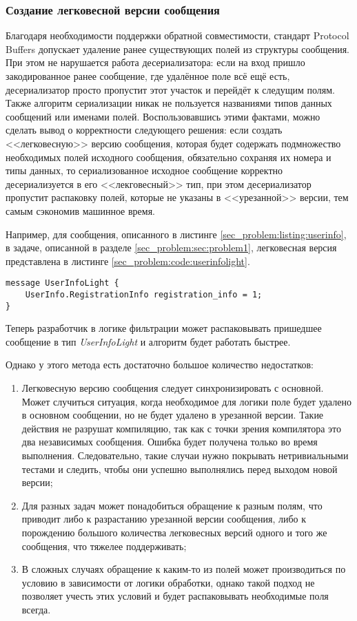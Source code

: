 \pagebreak

\subsubsection{Создание легковесной версии сообщения}

Благодаря необходимости поддержки обратной совместимости, стандарт Protocol Buffers допускает удаление ранее существующих полей из структуры сообщения.
При этом не нарушается работа десериализатора: если на вход пришло закодированное ранее сообщение, где удалённое поле всё ещё есть, десериализатор просто пропустит
этот участок и перейдёт к следущим полям. 
Также алгоритм сериализации никак не пользуется названиями типов данных сообщений или именами полей.
Воспользовавшись этими фактами, можно сделать вывод о корректности следующего решения: если создать <<легковесную>> версию сообщения, которая будет содержать подмножество
необходимых полей исходного сообщения, обязательно сохраняя их номера и типы данных, то сериализованное исходное сообщение корректно десериализуется в его <<лекговесный>>
тип, при этом десериализатор пропустит распаковку полей, которые не указаны в <<урезанной>> версии, тем самым сэкономив машинное время.

Например, для сообщения, описанного в листинге \ref{sec_problem:listing:userinfo}, в задаче, описанной в 
разделе \ref{sec_problem:sec:problem1}, легковесная версия представлена в листинге \ref{sec_problem:code:userinfolight}.
\begin{lstlisting}[style=CodeListing, label={sec_problem:code:userinfolight}, caption={Легковесная версия сообщения UserInfo}]
message UserInfoLight {
    UserInfo.RegistrationInfo registration_info = 1;
}
\end{lstlisting}

Теперь разработчик в логике фильтрации может распаковывать пришедшее сообщение в тип \textit{UserInfoLight} и алгоритм будет работать быстрее.

Однако у этого метода есть достаточно большое количество недостатков:
\begin{enumerate}
    \item Легковесную версию сообщения следует синхронизировать с основной. Может случиться ситуация, когда необходимое для логики поле будет удалено в основном сообщении, но не будет удалено в урезанной версии. Такие действия не разрушат компиляцию, так как с точки зрения компилятора это два независимых сообщения. Ошибка будет получена только во время выполнения. Следовательно, такие случаи нужно покрывать нетривиальными тестами и следить, чтобы они успешно выполнялись перед выходом новой версии;
    \item Для разных задач может понадобиться обращение к разным полям, что приводит либо к разрастанию урезанной версии сообщения, либо к порождению большого количества легковесных версий одного и того же сообщения, что тяжелее поддерживать;
    \item В сложных случаях обращение к каким-то из полей может производиться по условию в зависимости от логики обработки, однако такой подход не позволяет учесть этих условий и будет распаковывать необходимые поля всегда.
\end{enumerate}

